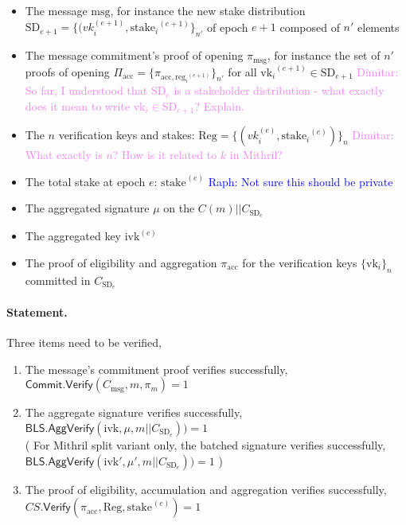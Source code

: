 \documentclass{article}
\newcommand{\vk}[1]{\ensuremath{\textrm{vk}_{#1}}\xspace}
\newcommand{\m}{\ensuremath{\textrm{msg}}\xspace}
\newcommand{\acc}{\ensuremath{\textrm{acc}}\xspace}
\newcommand{\reg}[1]{\ensuremath{\textrm{reg}_{#1}}\xspace}
\newcommand{\stake}[1]{\ensuremath{\textrm{stake}_{#1}}\xspace}
\newcommand{\ivk}{\ensuremath{\textrm{ivk}}\xspace}
\newcommand{\BLS}{\ensuremath{\mathsf{BLS}}\xspace}
\newcommand{\Verify}{\ensuremath{\mathsf{Verify}}\xspace}
\newcommand{\AggVerify}{\ensuremath{\mathsf{AggVerify}}\xspace}
\newcommand{\Commit}{\ensuremath{\mathsf{Commit}}\xspace}
\newcommand{\raph}[1]{\textcolor{blue}{Raph: #1}\xspace}
\newcommand{\dimitar}[1]{\textcolor{violet}{Dimitar: #1}\xspace}
\begin{document}
\begin{itemize}
    \item The message \m, for instance the new stake distribution $\text{SD}_{e+1} = \{ (vk_i^{(e+1)}, \stake{i}^{(e+1)} \}_{n'} $ of epoch $e+1$ composed of $n'$ elements
    \item The message commitment's proof of opening $\pi_\m$, for instance the set of $n'$ proofs of opening $\Pi_\acc = \{ \pi_{\acc, \reg{i}^{(e+1)}} \}_{n'}$  for all $\vk{i}^{(e+1)} \in \text{SD}_{e+1}$ \dimitar{So far, I understood that $\text{SD}_{e}$ is a stakeholder distribution - what exactly does it mean to write $\vk{i} \in \text{SD}_{e+1}$? Explain.}
    \item The $n$ verification keys and stakes: $\text{Reg} = \{ (vk_i^{(e)}, \stake{i}^{(e)} ) \}_n$ \dimitar{What exactly is $n$? How is it related to $k$ in Mithril?}
    \item The total stake at epoch $e$: $\stake{}^{(e)}$ \raph{Not sure this should be private}
    \item The aggregated signature $\mu$ on the $C(m) || C_{\text{SD}_e}$
    \item The aggregated key $\ivk^{(e)}$
    \item The proof of eligibility and aggregation $\pi_{\acc}$ for the verification keys $\{\vk{i}\}_n$ committed in $C_{\text{SD}_e}$
\end{itemize}

\paragraph{Statement.}

Three items need to be verified,
\begin{enumerate}
    \item The message's commitment proof verifies successfully,\\ $\Commit.\Verify(C_\m, m, \pi_m) = 1$
    \item The aggregate signature verifies successfully,\\ $\BLS.\AggVerify(\ivk, \mu, m || C_{\text{SD}_e})) = 1$\\
    ( For Mithril split variant only, the batched signature verifies successfully,\\ $\BLS.\AggVerify(\ivk', \mu', m || C_{\text{SD}_e})) = 1$ )
    \item The proof of eligibility, accumulation and aggregation verifies successfully,\\ $CS.\Verify(\pi_{\acc}, \text{Reg}, \stake{}^{(e)}) = 1 $
\end{enumerate}
\end{document}

